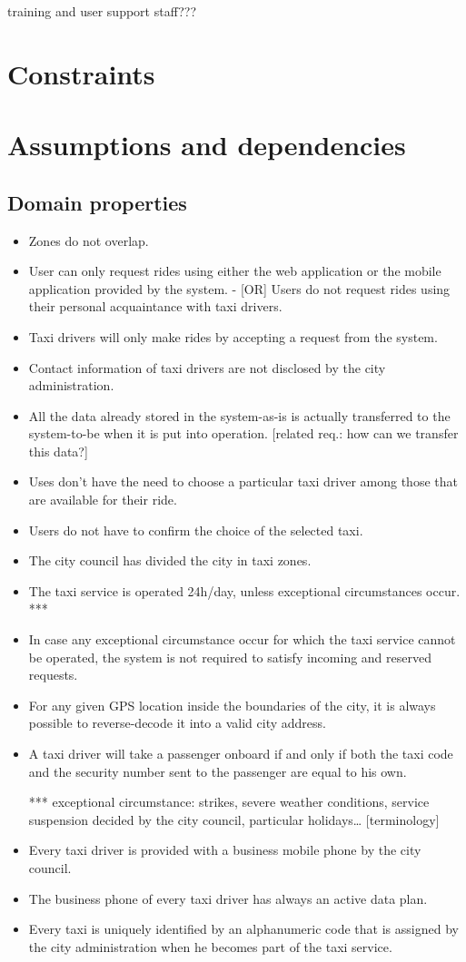 training and user support staff???

\section{Constraints}

\section{Assumptions and dependencies}
\subsection{Domain properties}
\begin{itemize}
\item Zones do not overlap.
\item User can only request rides using either the web application or the mobile application provided by the system.
- [OR] Users do not request rides using their personal acquaintance with taxi drivers.
\item Taxi drivers will only make rides by accepting a request from the system.
\item Contact information of taxi drivers are not disclosed by the city administration.
\item All the data already stored in the system-as-is is actually transferred to the system-to-be when it is put into operation. [related req.: how can we transfer this data?]
\item Uses don't have the need to choose a particular taxi driver among those that are available for their ride.
\item Users do not have to confirm the choice of the selected taxi.
\item The city council has divided the city in taxi zones.
\item The taxi service is operated 24h/day, unless exceptional circumstances occur. ***
\item In case any exceptional circumstance occur for which the taxi service cannot be operated, the system is not required to satisfy incoming and reserved requests. 
\item For any given GPS location inside the boundaries of the city, it is always possible to reverse-decode it into a valid city address. 
\item A taxi driver will take a passenger onboard if and only if both the taxi code and the security number sent to the passenger are equal to his own. 

*** exceptional circumstance: strikes, severe weather conditions, service suspension decided by the city council, particular holidays… [terminology]
\item Every taxi driver is provided with a business mobile phone by the city council.
\item The business phone of every taxi driver has always an active data plan.
\item Every taxi is uniquely identified by an alphanumeric code that is assigned by the city administration when he becomes part of the taxi service.
\end{itemize}

